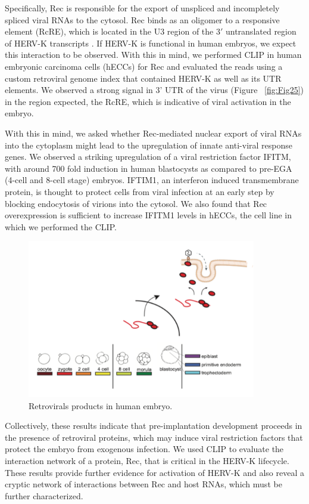 Specifically, Rec is responsible for the export of unspliced and incompletely spliced viral RNAs to the cytosol. Rec binds as an oligomer to a responsive element (RcRE), which is located in the U3 region of the 3$'$ untranslated region of HERV-K transcripts \cite{Lower:tg}. If HERV-K is functional in human embryos, we expect this interaction to be observed. With this in mind, we performed CLIP in human embryonic carcinoma cells (hECCs) for Rec and evaluated the reads using a custom retroviral genome index that contained HERV-K as well as its UTR elements. We observed a strong signal in 3' UTR of the virus (Figure ~\ref{fig:Fig25}) in the region expected, the RcRE, which is indicative of viral activation in the embryo. 

With this in mind, we asked whether Rec-mediated nuclear export of viral RNAs into the cytoplasm might lead to the upregulation of innate anti-viral response genes. We observed a striking upregulation of a viral restriction factor IFITM, with around 700 fold induction in human blastocysts as compared to pre-EGA (4-cell and 8-cell stage) embryos. IFTIM1, an interferon induced transmembrane protein, is thought to protect cells from viral infection at an early step by blocking endocytosis of virions into the cytosol. We also found that Rec overexpression is sufficient to increase IFITM1 levels in hECCs, the cell line in which we performed the CLIP. 

\begin{figure}
\center\includegraphics[width=100mm,scale=0.5]{Figures/Fig27}
\caption{Retrovirals products in human embryo.}
\label{fig:Fig27}
\end{figure}

Collectively, these results indicate that pre-implantation development proceeds in the presence of retroviral proteins, which may induce viral restriction factors that protect the embryo from exogenous infection. We used CLIP to evaluate the interaction network of a protein, Rec, that is critical in the HERV-K lifecycle. These results provide further evidence for activation of HERV-K and also reveal a cryptic network of interactions between Rec and host RNAs, which must be further characterized. 
